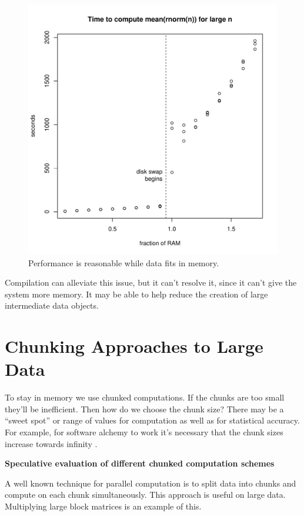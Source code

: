 \documentclass[12pt]{article}
\begin{document}
\begin{figure}
\centering
\includegraphics[width=.8\linewidth]{swap/spinning_disk_swap}
\caption{Performance is reasonable while data fits in memory.}
\label{fig:spinning_disk_swap}
\end{figure}

Compilation can alleviate this issue, but it can't resolve it, since it
can't give the system more memory. It may be able to help reduce the
creation of large intermediate data objects.


\section{Chunking Approaches to Large Data}

To stay in memory we use chunked computations. If the chunks are too small
they'll be inefficient. Then how do we choose the chunk size?  There may be
a ``sweet spot'' or range of values for computation as well as for
statistical accuracy. For example, for software alchemy to work it's
necessary that the chunk sizes increase towards infinity
\cite{matloff2014software}.



\textbf{Speculative evaluation of different chunked computation schemes}

A well known technique for parallel computation is to split data into
chunks and compute on each chunk simultaneously. This approach 
is useful on large data. Multiplying large block matrices is an example of this.
\end{document}
